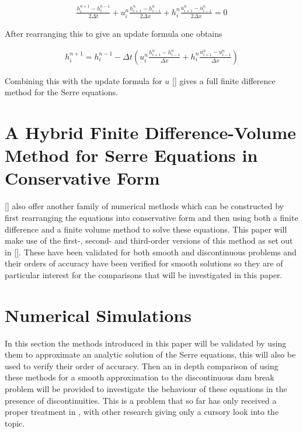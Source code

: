 \documentclass[SingleSpace,12pt,Proceedings]{Serre_ASCE}
\begin{document}
\begin{linenomath*}
\begin{gather}
\frac{h^{n+1}_i - h^{n-1}_i}{2\Delta t} + u^{n}_{i}\frac{h^{n}_{i+1} - h^{n}_{i-1}}{2\Delta x} + h^{n}_{i}\frac{u^{n}_{i+1} - u^{n}_{i-1}}{2\Delta x} = 0
\end{gather}
\end{linenomath*}


After rearranging this to give an update formula one obtains

\begin{linenomath*}
\begin{gather}
h^{n+1}_i = h^{n-1}_i - \Delta t \left(u^{n}_{i}\frac{h^{n}_{i+1} - h^{n}_{i-1}}{\Delta x} + h^{n}_{i}\frac{u^{n}_{i+1} - u^{n}_{i-1}}{\Delta x}\right) 
\end{gather}
\end{linenomath*}

Combining this with the update formula for $u$ [] gives a full finite difference method for the Serre equations. 

\section{A Hybrid Finite Difference-Volume Method for Serre Equations in Conservative Form}
\label{section:hybridmethod}
[] also offer another family of numerical methods which can be constructed by first rearranging the equations into conservative form and then using both a finite difference and a finite volume method to solve these equations. This paper will make use of the first-, second- and third-order versions of this method as set out in []. These have been validated for both smooth and discontinuous problems and their orders of accuracy have been verified for smooth solutions so they are of particular interest for the comparisons that will be investigated in this paper. 


\section{Numerical Simulations}
\label{section:Numerical Simulations}
In this section the methods introduced in this paper will be validated by using them to approximate an analytic solution of the Serre equations, this will also be used to verify their order of accuracy. Then an in depth comparison of using these methods for a smooth approximation to the discontinuous dam break problem will be provided to investigate the behaviour of these equations in the presence of discontinuities. This is a problem that so far has only received a proper treatment in \cite{El-etal-2006}, with other research giving only a cursory look into the topic. 
\end{document}
